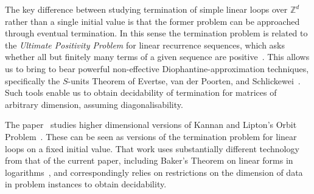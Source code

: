 The key difference between studying termination of simple linear loops
over $\mathbb{Z}^d$ rather than a single initial value is that the
former problem can be approached through eventual termination.  In
this sense the termination problem is related to the \emph{Ultimate
  Positivity Problem} for linear recurrence sequences, which asks
whether all but finitely many terms of a given sequence are
positive~\cite{OuaknineW14a}.  This allows us to bring to bear powerful
non-effective Diophantine-approximation techniques,
specifically the $S$-units Theorem of Evertse, van der Poorten, and
Schlickewei~\cite{Evertse84,PS82}.  Such tools enable us to obtain
decidability of termination for matrices of arbitrary dimension,
assuming diagonalisability.

The paper~\cite{COW14:SODA} studies higher dimensional versions of
Kannan and Lipton's Orbit Problem~\cite{KL86}.  These can be seen as
versions of the termination problem for linear loops on a fixed
initial value.  That work uses substantially different technology from
that of the current paper, including Baker's Theorem on linear forms
in logarithms~\cite{BW93}, and correspondingly relies on restrictions
on the dimension of data in problem instances to obtain decidability.

